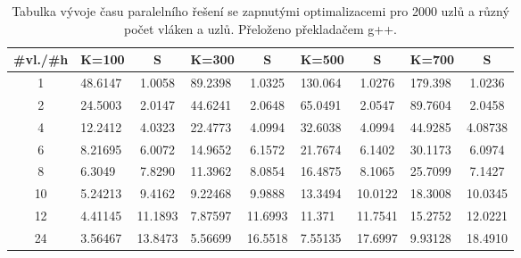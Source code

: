\documentclass[a4paper,11pt]{article}
\begin{document}
     \begin{table}[ht]
  \begin{center}
   \begin{tabular}{|c|l|c|l|c|l|c|l|c|}
    \hline 
    \#vl./\#h & K=100 & S & K=300 & S & K=500 & S & K=700 & S\\
   \hline 
   \hline 
   1 & 48.6147 & 1.0058 & 89.2398 & 1.0325 & 130.064 & 1.0276 & 179.398 & 1.0236\\
   \hline
    2 & 24.5003 & 2.0147 & 44.6241 & 2.0648 & 65.0491 & 2.0547 & 89.7604 & 2.0458\\
   \hline
    4 & 12.2412 & 4.0323 & 22.4773 & 4.0994 & 32.6038 & 4.0994 & 44.9285 & 4.08738\\
   \hline
    6 & 8.21695 & 6.0072 & 14.9652 & 6.1572 & 21.7674 & 6.1402 & 30.1173 & 6.0974\\
   \hline
    8 & 6.3049 & 7.8290 & 11.3962 & 8.0854 & 16.4875 & 8.1065 & 25.7099 & 7.1427\\
   \hline
    10 & 5.24213 & 9.4162 & 9.22468 & 9.9888 & 13.3494 & 10.0122 & 18.3008 & 10.0345\\
   \hline
    12 & 4.41145 & 11.1893 & 7.87597 & 11.6993 & 11.371 & 11.7541 & 15.2752 & 12.0221\\
   \hline
    24 & 3.56467 & 13.8473 & 5.56699 & 16.5518 & 7.55135 & 17.6997 & 9.93128 & 18.4910\\
   \hline
   \hline
    \end{tabular}
   \caption{Tabulka vývoje času paralelního řešení se zapnutými optimalizacemi pro 2000 uzlů a různý počet vláken a uzlů. Přeloženo 
   překladačem g++.} 
   \label{tab.tab6}
  \end{center}   
  \end{table}
  
\end{document}
